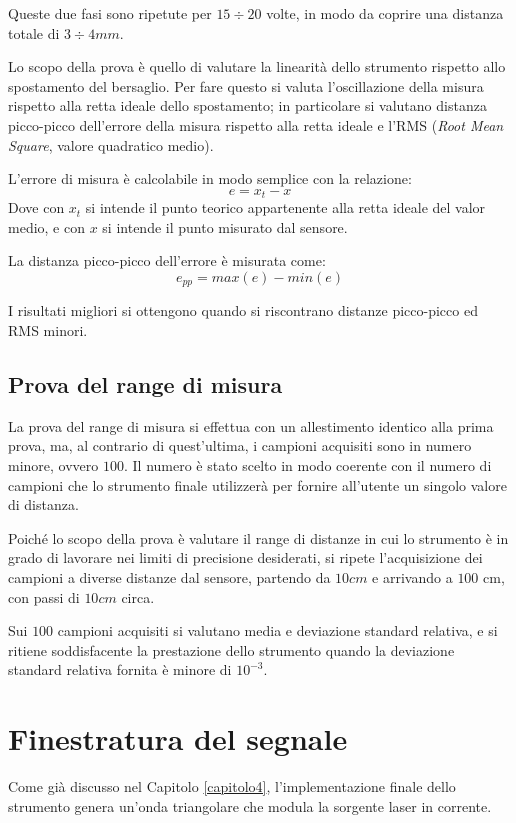Queste due fasi sono ripetute per $15 \div 20$ volte, in modo da coprire una distanza totale di $3 \div 4mm$.

Lo scopo della prova è quello di valutare la linearità dello strumento rispetto allo spostamento del bersaglio. Per fare questo si valuta l'oscillazione della misura rispetto alla retta ideale dello spostamento; in particolare si valutano distanza picco-picco dell'errore della misura rispetto alla retta ideale e l'RMS (\textit{Root Mean Square}, valore quadratico medio).

L'errore di misura è calcolabile in modo semplice con la relazione:
\begin{equation}
	e = x_t - x 
\end{equation}
Dove con $x_t$ si intende il punto teorico appartenente alla retta ideale del valor medio, e con $x$ si intende il punto misurato dal sensore. 

La distanza picco-picco dell'errore è misurata come:
\begin{equation}
	e_{pp} = max(e) - min(e)
\end{equation}

I risultati migliori si ottengono quando si riscontrano distanze picco-picco ed RMS minori.

\subsection{Prova del range di misura}
La prova del range di misura si effettua con un allestimento identico alla prima prova, ma, al contrario di quest'ultima, i campioni acquisiti sono in numero minore, ovvero $100$. Il numero è stato scelto in modo coerente con il numero di campioni che lo strumento finale utilizzerà per fornire all'utente un singolo valore di distanza. 

Poiché lo scopo della prova è valutare il range di distanze in cui lo strumento è in grado di lavorare nei limiti di precisione desiderati, si ripete l'acquisizione dei campioni a diverse distanze dal sensore, partendo da $10cm$ e arrivando a $100$ cm, con passi di $10cm$ circa.

Sui $100$ campioni acquisiti si valutano media e deviazione standard relativa, e si ritiene soddisfacente la prestazione dello strumento quando la deviazione standard relativa fornita è minore di $10^{-3}$.

\section{Finestratura del segnale}
Come già discusso nel Capitolo \ref{capitolo4}, l'implementazione finale dello strumento genera un'onda triangolare che modula la sorgente laser in corrente. 

